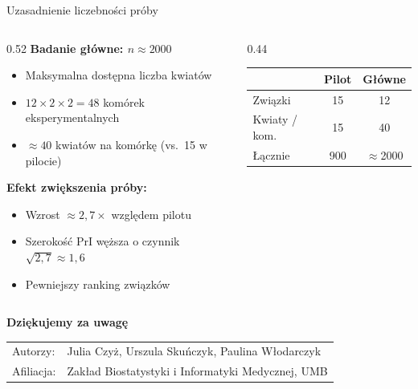 \documentclass[aspectratio=169, 12pt]{beamer}
\begin{document}
\begin{frame}{Uzasadnienie liczebności próby}
    \begin{columns}
        \begin{column}{0.52\textwidth}
            \textbf{Badanie główne: $n \approx 2000$}
            \begin{itemize}
                \item Maksymalna dostępna liczba kwiatów
                \item $12 \times 2 \times 2 = 48$ komórek eksperymentalnych
                \item $\approx 40$ kwiatów na komórkę (vs.\ 15 w pilocie)
            \end{itemize}
            \vspace{0.5em}
            \textbf{Efekt zwiększenia próby:}
            \begin{itemize}
                \item Wzrost $\approx 2{,}7\times$ względem pilotu
                \item Szerokość PrI węższa o czynnik $\sqrt{2{,}7} \approx 1{,}6$
                \item Pewniejszy ranking związków
            \end{itemize}
        \end{column}
        \begin{column}{0.44\textwidth}
            \centering
            \begin{tabular}{lcc}
                \toprule
                & \textbf{Pilot} & \textbf{Główne} \\
                \midrule
                Związki        & 15  & 12            \\
                Kwiaty / kom.  & 15  & 40            \\
                Łącznie        & 900 & $\approx$2000 \\
                \bottomrule
            \end{tabular}
        \end{column}
    \end{columns}
\end{frame}

\begin{frame}[plain]
    \centering
    \vspace{2.5em}
    {\Large \textbf{Dziękujemy za uwagę}}\\[1.5em]
    \small
    \begin{tabular}{ll}
        Autorzy:   & Julia Czyż, Urszula Skuńczyk, Paulina Włodarczyk \\
        Afiliacja: & Zakład Biostatystyki i Informatyki Medycznej, UMB \\
    \end{tabular}
\end{frame}

\end{document}
